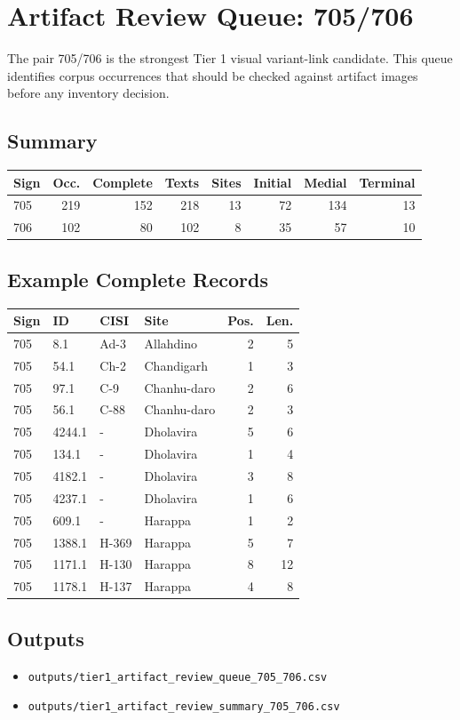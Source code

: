 ﻿\documentclass[11pt,a4paper]{article}
\begin{document}
\section*{Artifact Review Queue: 705/706}
The pair 705/706 is the strongest Tier 1 visual variant-link candidate. This queue identifies corpus occurrences that should be checked against artifact images before any inventory decision.
\subsection*{Summary}
\begin{center}
\begin{tabular}{lrrrrrrr}
\toprule
\textbf{Sign} & \textbf{Occ.} & \textbf{Complete} & \textbf{Texts} & \textbf{Sites} & \textbf{Initial} & \textbf{Medial} & \textbf{Terminal} \\
\midrule
705 & 219 & 152 & 218 & 13 & 72 & 134 & 13 \\
706 & 102 & 80 & 102 & 8 & 35 & 57 & 10 \\
\bottomrule
\end{tabular}
\end{center}
\subsection*{Example Complete Records}
\begin{center}
\begin{tabular}{llllrr}
\toprule
\textbf{Sign} & \textbf{ID} & \textbf{CISI} & \textbf{Site} & \textbf{Pos.} & \textbf{Len.} \\
\midrule
705 & 8.1 & Ad-3 & Allahdino & 2 & 5 \\
705 & 54.1 & Ch-2 & Chandigarh & 1 & 3 \\
705 & 97.1 & C-9 & Chanhu-daro & 2 & 6 \\
705 & 56.1 & C-88 & Chanhu-daro & 2 & 3 \\
705 & 4244.1 & - & Dholavira & 5 & 6 \\
705 & 134.1 & - & Dholavira & 1 & 4 \\
705 & 4182.1 & - & Dholavira & 3 & 8 \\
705 & 4237.1 & - & Dholavira & 1 & 6 \\
705 & 609.1 & - & Harappa & 1 & 2 \\
705 & 1388.1 & H-369 & Harappa & 5 & 7 \\
705 & 1171.1 & H-130 & Harappa & 8 & 12 \\
705 & 1178.1 & H-137 & Harappa & 4 & 8 \\
\bottomrule
\end{tabular}
\end{center}
\subsection*{Outputs}
\begin{itemize}
\item \texttt{outputs/tier1\_artifact\_review\_queue\_705\_706.csv}
\item \texttt{outputs/tier1\_artifact\_review\_summary\_705\_706.csv}
\end{itemize}
\end{document}
